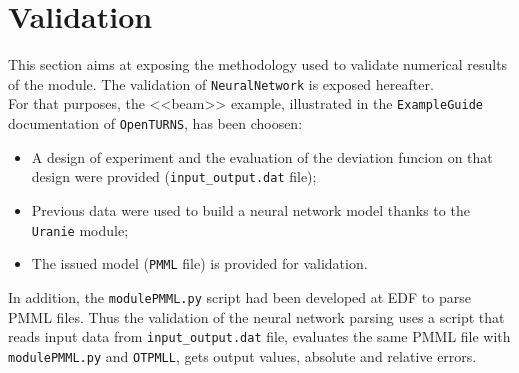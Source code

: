 %


\section{Validation}

This section aims at exposing the methodology used to validate numerical results of the module. The validation of \texttt{NeuralNetwork} is exposed hereafter.\\

For that purposes, the <<beam>> example, illustrated in the \texttt{ExampleGuide} documentation of \texttt{OpenTURNS}, has been choosen:
\begin{itemize}
 \item A design of experiment and the evaluation of the deviation funcion on that design were provided (\verb+input_output.dat+ file);
 \item Previous data were used to build a neural network model thanks to the \texttt{Uranie} module;
 \item The issued model (\texttt{PMML} file) is provided for validation.
\end{itemize}
In addition, the \texttt{modulePMML.py} script had been developed at EDF to parse PMML files. Thus the validation of the neural network parsing uses a script that
reads input data from \verb+input_output.dat+ file, evaluates the same PMML file with \texttt{modulePMML.py} and \texttt{OTPMLL}, gets output values, absolute and relative errors.


